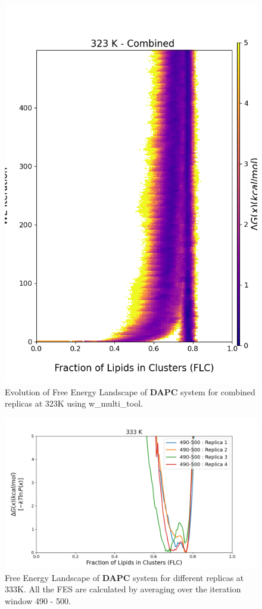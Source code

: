 \documentclass{biophys-new}
\begin{document}
\begin{figure}[hbt!]
\centering
\includegraphics[width=0.8\linewidth]{all_plots/ClusterLipids2Total/DPPC_DAPC_CHOL/323K/Evolution_DAPC_MULTI__323_ClusterLipids2Total.png}
\caption{Evolution of Free Energy Landscape of \textbf{DAPC} system for combined replicas at 323K using w\_multi\_tool.}
\label{fig:view}

\end{figure}


\begin{figure}[hbt!]
\centering
\includegraphics[width=1.1\linewidth]{all_plots/ClusterLipids2Total/DPPC_DAPC_CHOL/333K/Average_DAPC_333_ClusterLipids2Total.png}
\caption{Free Energy Landscape of \textbf{DAPC} system for different replicas at 333K. All the FES are calculated by averaging over the iteration window 490 - 500.}
\label{fig:view}

\end{figure}
\end{document}

